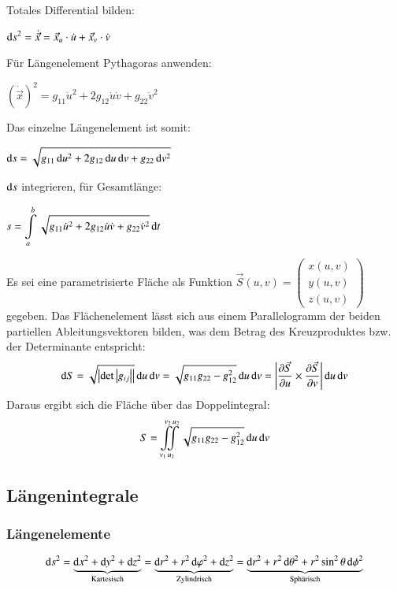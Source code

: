 \medskip
Totales Differential bilden: 
\hfill\parbox{.5\columnwidth}{\centering $\displaystyle \mathop{} \! \mathrm{d} s^2 = \dot{\vec{x}} = \vec{x}_u \cdot \dot{u} + \vec{x}_v \cdot \dot{v}$}

\medskip
Für Längenelement Pythagoras anwenden: 
\hfill\parbox{.48\columnwidth}{\centering $\displaystyle (\dot{\vec{x}})^2 = g_{11} \dot{u}^2 + 2 g_{12} \dot{u} \dot{v} + g_{22} \dot{v}^2$}

\medskip
Das einzelne Längenelement ist somit:
\hfill\parbox{.48\columnwidth}{\centering $\displaystyle \mathop{} \! \mathrm{d} s = \sqrt{g_{11} \mathop{} \! \mathrm{d} u^2 + 2 g_{12} \mathop{} \! \mathrm{d} u \mathop{} \! \mathrm{d} v + g_{22} \mathop{} \! \mathrm{d} v^2}$}

\medskip
$\mathop{} \! \mathrm{d} s$ integrieren, für Gesamtlänge: 
\hfill\parbox{.48\columnwidth}{\centering $\displaystyle s = \int\limits_{a}^{b} \sqrt{g_{11} \dot{u}^2 + 2 g_{12} \dot{u} \dot{v} + g_{22} \dot{v}^2} \mathop{} \! \mathrm{d} t$}


Es sei eine parametrisierte Fläche als Funktion $\vec{S}(u,v) = \begin{pmatrix}
    x(u,v)\\
    y(u,v)\\
    z(u,v)
\end{pmatrix}$ gegeben.
Das Flächenelement lässt sich aus einem Parallelogramm der beiden partiellen Ableitungsvektoren bilden, 
was dem Betrag des Kreuzproduktes bzw. der Determinante entspricht:
\[
    \mathop{} \! \mathrm{d} S = \sqrt{\left|\det\left|g_{ij}\right|\right|}\mathop{} \! \mathrm{d} u \mathop{} \! \mathrm{d} v = \sqrt{g_{11}g_{22} - g_{12}^2} \mathop{} \! \mathrm{d} u \mathop{} \! \mathrm{d} v = \left|\frac{\partial \vec{S}}{\partial u} \times \frac{\partial \vec{S}}{\partial v}\right| \mathop{} \! \mathrm{d} u \mathop{} \! \mathrm{d} v
\]
Daraus ergibt sich die Fläche über das Doppelintegral:
\[
    S = \iint\limits_{v_1\, u_1}^{v_2\, u_2} \sqrt{g_{11}g_{22} - g_{12}^2} \mathop{} \! \mathrm{d} u \mathop{} \! \mathrm{d} v
\]


\subsection{Längenintegrale}
\subsubsection{Längenelemente}\label{section:int_multivar:längenelemente}
$$
 \diff s^2 
    = \underbrace{\diff x^2 + \diff y^2 + \diff z^2}_{\text{Kartesisch}}
    = \underbrace{\diff r^2 + r^2 \diff \varphi^2 + \diff z^2}_{\text{Zylindrisch}}
    = \underbrace{\diff r^2 + r^2 \diff \theta^2 + r^2 \sin^2 \theta \diff \phi^2}_{\text{Sphärisch}}
$$
